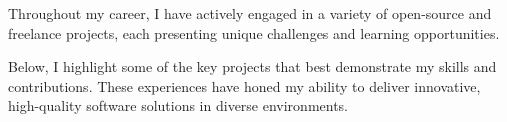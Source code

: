 


\begin{cvparagraph}
Throughout my career, I have actively engaged in a variety of open-source and freelance projects, each presenting unique challenges and learning opportunities.
\end{cvparagraph}

\begin{cvparagraph}
Below, I highlight some of the key projects that best demonstrate my skills and contributions. 
These experiences have honed my ability to deliver innovative, high-quality software solutions in diverse environments.
\end{cvparagraph}



